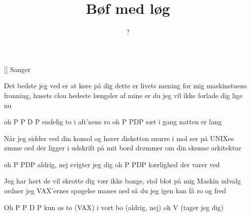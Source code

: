 \documentclass[a4paper,11pt]{article}
\title{Bøf med løg}
\author{?}
\begin{document}
\maketitle

\begin{roles}
[] Sanger
\end{roles}

\begin{song}
 Det bedste jeg ved er at køre på dig
          dette er livets mening for mig
          maskinstuens fronning, husets clou
          hedeste længsler af mine er du
          jeg vil ikke forlade dig lige nu

 oh P
          P D P
          endelig to
          i aft'nens ro
          oh P
          PDP
          sæt i gang
          natten er lang

 Når jeg sidder ved din konsol
          og hører disketten snurre i mol
          ser på UNIXes ømme ord
          der ligger i udskrift på mit bord
          drømmer om din skønne arkitektur

 oh P
          PDP
          aldrig, nej
          svigter jeg dig
          oh P
          PDP
          kærlighed
          der varer ved

 Jeg har hørt de vil skrotte dig
          vær ikke bange, stol blot på mig
          Maskin udvalg ordner jeg
          VAX'ernes spøgelse manes ned
          så du jeg igen kan få ro og fred

 Oh P
          P D P
          kun os to (VAX)
          i vort bo (aldrig, nej)
          oh V (tager jeg dig)
\end{song}
\end{document}
